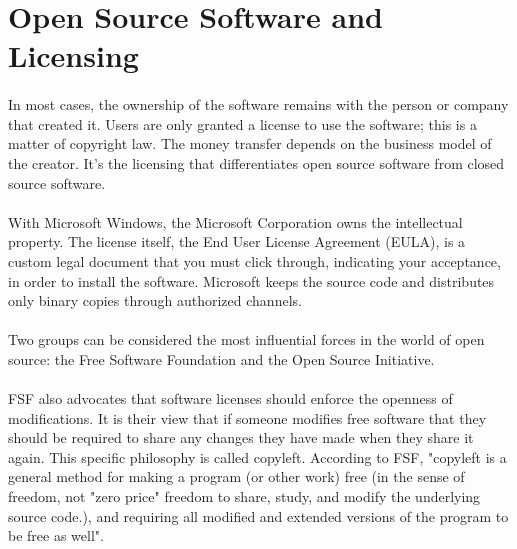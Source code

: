 \documentclass[10pt]{article}
\begin{document}
\section{Open Source Software and Licensing}

\paragraph{}In most cases, the ownership of the software remains with the person or company that created it. Users are only granted a license
to use the software; this is a matter of copyright law. The money transfer depends on the business model of the creator.
It’s the licensing that differentiates open source software from closed source software.

\paragraph{}With Microsoft Windows, the Microsoft Corporation owns the intellectual property. The license itself, the End User License
Agreement (EULA), is a custom legal document that you must click through, indicating your acceptance, in order to install the
software. Microsoft keeps the source code and distributes only binary copies through authorized channels.

\paragraph{}Two groups can be considered the most influential forces in the world of open source: the Free Software Foundation and the
Open Source Initiative.

\paragraph{}FSF also advocates that software licenses should enforce the openness of modifications. It is their view that if someone modifies
free software that they should be required to share any changes they have made when they share it again. This specific philosophy
is called copyleft. According to FSF, "copyleft is a general method for making a program (or other work) free (in the sense of
freedom, not "zero price" freedom to share, study, and modify the underlying source code.), and requiring all modified and extended versions
of the program to be free as well".
\end{document}
